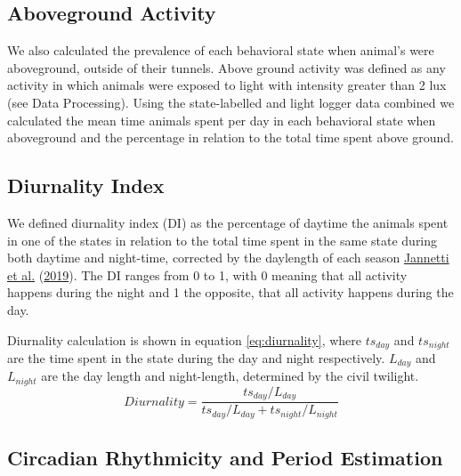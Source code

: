 \documentclass[msc,numbers,hidelinks]{coppe}
\begin{document}
  \hypertarget{aboveground-activity}{%
  \subsection{Aboveground Activity}\label{aboveground-activity}}

  We also calculated the prevalence of each behavioral state when animal's were aboveground, outside of their tunnels. Above ground activity was defined as any activity in which animals were exposed to light with intensity greater than 2 lux (see Data Processing). Using the state-labelled and light logger data combined we calculated the mean time animals spent per day in each behavioral state when aboveground and the percentage in relation to the total time spent above ground.

  \hypertarget{diurnality-index}{%
  \subsection{Diurnality Index}\label{diurnality-index}}

  We defined diurnality index (DI) as the percentage of daytime the animals spent in one of the states in relation to the total time spent in the same state during both daytime and night-time, corrected by the daylength of each season \protect\hyperlink{ref-jannetti2019}{Jannetti et al.} (\protect\hyperlink{ref-jannetti2019}{2019}). The DI ranges from 0 to 1, with 0 meaning that all activity happens during the night and 1 the opposite, that all activity happens during the day.

  Diurnality calculation is shown in equation \eqref{eq:diurnality}, where \(ts_{day}\) and \(ts_{night}\) are the time spent in the state during the day and night respectively. \(L_{day}\) and \(L_{night}\) are the day length and night-length, determined by the civil twilight.
  \begin{equation}
  Diurnality = \frac{ts_{day}/L_{day}}{ts_{day}/L_{day} + ts_{night}/L_{night}} \label{eq:diurnality}
  \end{equation}
  \hypertarget{circadian-rhythmicity-and-period-estimation}{%
  \subsection{Circadian Rhythmicity and Period Estimation}\label{circadian-rhythmicity-and-period-estimation}}
\end{document}
